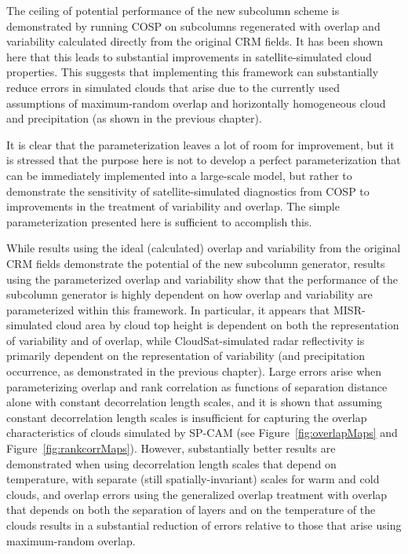 The ceiling of potential performance of the new subcolumn scheme is
demonstrated by running COSP on subcolumns regenerated with overlap and
variability calculated directly from the original CRM fields. It has
been shown here that this leads to substantial improvements in
satellite-simulated cloud properties. This suggests that implementing
this framework can substantially reduce errors in simulated clouds that
arise due to the currently used assumptions of maximum-random overlap
and horizontally homogeneous cloud and precipitation (as shown in the
previous chapter).

It is clear that the parameterization leaves a lot of room for
improvement, but it is stressed that the purpose here is not to develop
a perfect parameterization that can be immediately implemented into a
large-scale model, but rather to demonstrate the sensitivity of
satellite-simulated diagnostics from COSP to improvements in the
treatment of variability and overlap. The simple parameterization
presented here is sufficient to accomplish this.

While results using the ideal (calculated) overlap and variability from
the original CRM fields demonstrate the potential of the new subcolumn
generator, results using the parameterized overlap and variability show
that the performance of the subcolumn generator is highly dependent on
how overlap and variability are parameterized within this framework. In
particular, it appears that MISR-simulated cloud area by cloud top
height is dependent on both the representation of variability and of
overlap, while CloudSat-simulated radar reflectivity is primarily
dependent on the representation of variability (and precipitation
occurrence, as demonstrated in the previous chapter). Large errors arise
when parameterizing overlap and rank correlation as functions of
separation distance alone with constant decorrelation length scales, and
it is shown that assuming constant decorrelation length scales is
insufficient for capturing the overlap characteristics of clouds
simulated by SP-CAM (see Figure~\ref{fig:overlapMaps} and
Figure~\ref{fig:rankcorrMaps}). However, substantially better results
are demonstrated when using decorrelation length scales that depend on
temperature, with separate (still spatially-invariant) scales for warm
and cold clouds, and overlap errors using the generalized overlap
treatment with overlap that depends on both the separation of layers and
on the temperature of the clouds results in a substantial reduction of
errors relative to those that arise using maximum-random overlap.

